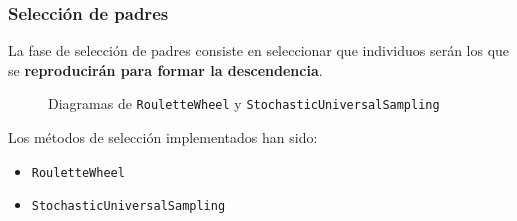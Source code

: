 \documentclass{beamer}
\begin{document}
\begin{frame}
\frametitle{Selección de padres}

La fase de selección de padres consiste en seleccionar que individuos serán los que se \textbf{reproducirán para formar la descendencia}.

\bigskip

\begin{figure}
    \centering
    \qquad
    \caption{Diagramas de \texttt{RouletteWheel} y \texttt{StochasticUniversalSampling}}
    \label{fig:1}
\end{figure}

Los métodos de selección implementados han sido:

\begin{itemize}
    \item \texttt{RouletteWheel}
    \item \texttt{StochasticUniversalSampling}
\end{itemize}

\end{frame}
\end{document}
